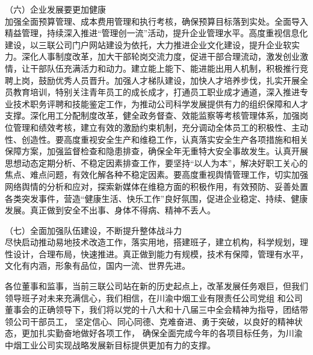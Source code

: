 （六）企业发展要更加健康\\
\indent
加强全面预算管理、成本费用管理和执行考核，确保预算目标落到实处。全面导入精益管理，持续深入推进“管理创一流”活动，提升企业管理水平。高度重视信息化建设，以三联公司门户网站建设为依托，大力推进企业文化建设，提升企业软实力。深化人事制度改革，加大干部轮岗交流力度，促进干部合理流动，激发创业激情，让干部队伍充满活力和动力。建立能上能下、能进能出用人机制，积极推行竞聘上岗，鼓励优秀人员晋升。加强人才梯队建设，加快人才培养步伐，扎实开展全员教育培训，特别关注青年员工的成长成才，打通员工职业成才通道，深入推进专业技术职务评聘和技能鉴定工作，为推动公司科学发展提供有力的组织保障和人才支撑。深化用工分配制度改革，健全政务督查、效能监察等考核管理体系，加强岗位管理和绩效考核，建立有效的激励约束机制，充分调动全体员工的积极性、主动性、创造性。要高度重视安全生产和维稳工作，认真落实安全生产各项措施和相关保障方案，加强监督检查和隐患排查，确保全年无重特大安全事故发生。认真开展思想动态定期分析、不稳定因素排查工作，要坚持“以人为本”，解决好职工关心的焦点、难点问题，有效化解各种不稳定因素。要高度重视舆情管理工作，切实加强网络舆情的分析和应对，探索新媒体在维稳方面的积极作用，有效预防、妥善处置各类突发事件，营造“健康生活、快乐工作”良好氛围，促进企业稳定、持续、健康发展。真正做到安全不出事、身体不得病、精神不丢人。


（七）全面加强队伍建设，不断提升整体战斗力\\
\indent
尽快启动推动易地技术改造工作，落实用地，搭建班子，建立机构，科学规划，理性设计，合理布局，快速推进。真正做到能力有规模，技术有保障，管理有水平，文化有内涵，形象有品位，国内一流、世界先进。


\indent
各位董事和监事，当前三联公司站在新的历史起点上，改革发展任务艰巨，但我们领导班子对未来充满信心，我们相信，在川渝中烟工业有限责任公司党组
和公司董事会的正确领导下，我们将以党的十八大和十八届三中全会精神为指导，团结带领公司干部员工，
坚定信心、同心同德、克难奋进、勇于突破，以良好的精神状态，更加扎实勤奋地做好各项工作，
确保全面完成今年的各项目标任务，为川渝中烟工业公司实现战略发展新目标提供更加有力的支撑。


